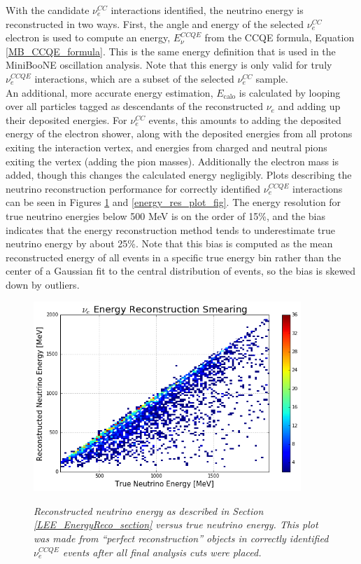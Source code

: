 With the candidate $\nu_e^{CC}$ interactions identified, the neutrino energy is reconstructed in two ways. First, the angle and energy of the selected $\nu_e^{CC}$ electron is used to compute an energy, $E_\nu^{CCQE}$ from the CCQE formula, Equation \ref{MB_CCQE_formula}. This is the same energy definition that is used in the MiniBooNE oscillation analysis. Note that this energy is only valid for truly $\nu_e^{CCQE}$ interactions, which are a subset of the selected $\nu_e^{CC}$ sample.\\

An additional, more accurate energy estimation, $E_{\text{calo}}$ is calculated by looping over all particles tagged as descendants of the reconstructed $\nu_e$ and adding up their deposited energies. For $\nu_e^{CC}$ events, this amounts to adding the deposited energy of the electron shower, along with the deposited energies from all protons exiting the interaction vertex, and energies from charged and neutral pions exiting the vertex (adding the pion masses). Additionally the electron mass is added, though this changes the calculated energy negligibly. Plots describing the neutrino reconstruction performance for correctly identified $\nu_e^{CCQE}$ interactions can be seen in Figures \ref{energy_smear_plot_fig} and \ref{energy_res_plot_fig}. The energy resolution for true neutrino energies below 500 MeV is on the order of 15\%, and the bias indicates that the energy reconstruction method tends to underestimate true neutrino energy by about 25\%. Note that this bias is computed as the mean reconstructed energy of all events in a specific true energy bin rather than the center of a Gaussian fit to the central distribution of events, so the bias is skewed down by outliers.

\begin{figure}[ht!]
\centering
\includegraphics[width=0.9\textwidth]{Figures/LEE_EnergySmear_WithAnalysisCuts.png}\\%
\caption{\textit{Reconstructed neutrino energy as described in Section \ref{LEE_EnergyReco_section} versus true neutrino energy. This plot was made from ``perfect reconstruction'' objects in correctly identified $\nu_e^{CCQE}$ events after all final analysis cuts were placed.}}
\label{energy_smear_plot_fig}
\end{figure}

